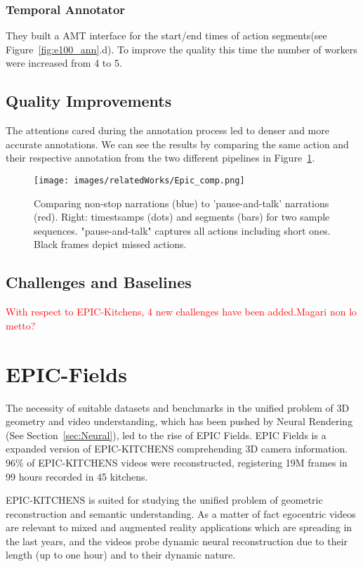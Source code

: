 \subsubsection{Temporal Annotator}
They built a AMT interface for the start/end times of action segments(see Figure~\ref{fig:e100_ann}.d).
To improve the quality this time the number of workers were increased from 4 to 5.

\subsection{Quality Improvements}
The attentions cared during the annotation process led to denser and more accurate annotations.
We can see the results by comparing the same action and their respective annotation from the
two different pipelines in Figure~\ref{fig:ep100_comp}.

\begin{figure}
    \centering
    \texttt{[image: images/relatedWorks/Epic\_comp.png]} 
    \caption{Comparing non-stop narrations (blue) to 'pause-and-talk' narrations (red).
    Right: timestsamps (dots) and segments (bars) for two sample sequences. "pause-and-talk"
    captures all actions including short ones. Black frames depict missed actions.}\label{fig:ep100_comp}
\end{figure}

\subsection{Challenges and Baselines}
\textcolor{red}{With respect to EPIC-Kitchens, 4 new challenges have 
been added.Magari non lo metto? }

\section{EPIC-Fields}
The necessity of suitable datasets and benchmarks in the unified problem of 3D geometry and video understanding, which has been
pushed by Neural Rendering (See Section~\ref{sec:Neural}), led to the rise of EPIC Fields. EPIC Fields is a expanded version of 
EPIC-KITCHENS comprehending 3D camera information. 96\% of EPIC-KITCHENS videos were reconstructed, registering 19M frames in 
99 hours recorded in 45 kitchens.

EPIC-KITCHENS is suited for studying the unified problem of geometric reconstruction and semantic understanding. As a matter
of fact egocentric videos  are relevant to mixed and augmented reality applications which are spreading in the last years, and 
the videos probe dynamic neural reconstruction due to their length (up to one hour) and to their dynamic nature.

